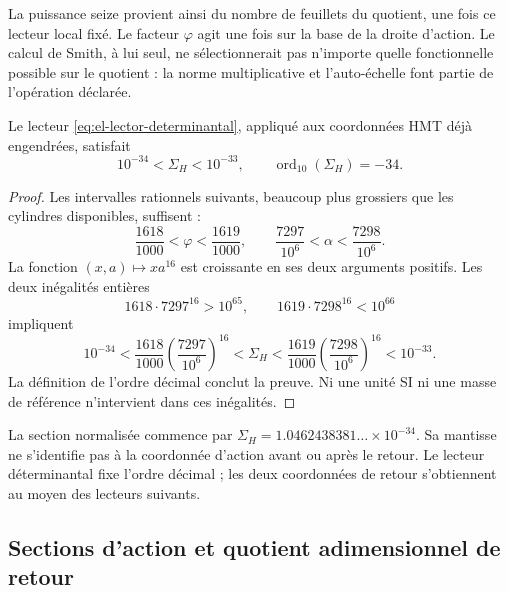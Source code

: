 La puissance seize provient ainsi du nombre de feuillets du quotient, une
fois ce lecteur local fixé. Le facteur \(\varphi\) agit une fois sur
la base de la droite d'action. Le calcul de Smith, à lui seul, ne
sélectionnerait pas n'importe quelle fonctionnelle possible sur le quotient : la norme
multiplicative et l'auto-échelle font partie de l'opération déclarée.

\begin{theorem}
Le lecteur \eqref{eq:el-lector-determinantal}, appliqué aux coordonnées
HMT déjà engendrées, satisfait
\begin{equation}
 10^{-34}<\Sigma_H<10^{-33},\qquad
 \operatorname{ord}_{10}(\Sigma_H)=-34.
 \label{eq:el-decada}
\end{equation}
\end{theorem}
\begin{proof}
Les intervalles rationnels suivants, beaucoup plus grossiers que les cylindres
disponibles, suffisent :
\[
 \frac{1618}{1000}<\varphi<\frac{1619}{1000},\qquad
 \frac{7297}{10^6}<\alpha<\frac{7298}{10^6}.
\]
La fonction \((x,a)\mapsto xa^{16}\) est croissante en ses deux arguments
positifs. Les deux inégalités entières
\[
 1618\cdot7297^{16}>10^{65},\qquad
 1619\cdot7298^{16}<10^{66}
\]
impliquent
\[
 10^{-34}
 <\frac{1618}{1000}\left(\frac{7297}{10^6}\right)^{16}
 <\Sigma_H
 <\frac{1619}{1000}\left(\frac{7298}{10^6}\right)^{16}
 <10^{-33}.
\]
La définition de l'ordre décimal conclut la preuve. Ni une
unité SI ni une masse de référence n'intervient dans ces inégalités.
\end{proof}

La section normalisée commence par
\(\Sigma_H=1.0462438381\ldots\times10^{-34}\). Sa mantisse ne
s'identifie pas à la coordonnée d'action avant ou après le retour.
Le lecteur déterminantal fixe l'ordre décimal ; les deux coordonnées de
retour s'obtiennent au moyen des lecteurs suivants.


\subsection{Sections d'action et quotient adimensionnel de retour}

